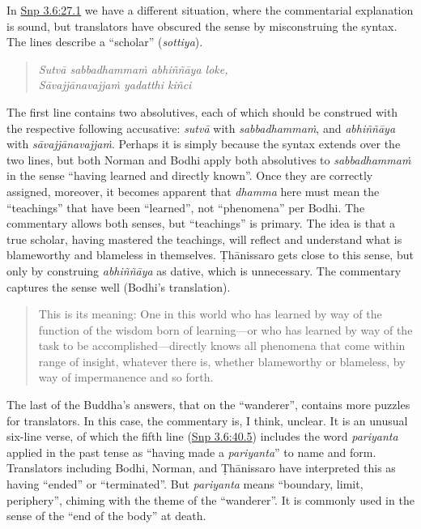 \documentclass[12pt,openany]{book}%
\begin{document}
In \href{https://suttacentral.net/snp3.6/en/sujato\#27.1}{Snp 3.6:27.1} we have a different situation, where the commentarial explanation is sound, but translators have obscured the sense by misconstruing the syntax. The lines describe a “scholar” (\textit{sottiya}). 

\begin{verse}%
\textit{\textsanskrit{Sutvā} \textsanskrit{sabbadhammaṁ} \textsanskrit{abhiññāya} loke,} \\
\textit{\textsanskrit{Sāvajjānavajjaṁ} yadatthi \textsanskrit{kiñci}}

%
\end{verse}

The first line contains two absolutives, each of which should be construed with the respective following accusative: \textit{\textsanskrit{sutvā}} with \textit{\textsanskrit{sabbadhammaṁ}}, and \textit{\textsanskrit{abhiññāya}} with \textit{\textsanskrit{sāvajjānavajjaṁ}}. Perhaps it is simply because the syntax extends over the two lines, but both Norman and Bodhi apply both absolutives to \textit{\textsanskrit{sabbadhammaṁ}} in the sense “having learned and directly known”. Once they are correctly assigned, moreover, it becomes apparent that \textit{dhamma} here must mean the “teachings” that have been “learned”, not “phenomena” per Bodhi. The commentary allows both senses, but “teachings” is primary. The idea is that a true scholar, having mastered the teachings, will reflect and understand what is blameworthy and blameless in themselves. \textsanskrit{Ṭhānissaro} gets close to this sense, but only by construing \textit{\textsanskrit{abhiññāya}} as dative, which is unnecessary. The commentary captures the sense well (Bodhi’s translation).

\begin{quotation}%
This is its meaning: One in this world who has learned by way of the function of the wisdom born of learning—or who has learned by way of the task to be accomplished—directly knows all phenomena that come within range of insight, whatever there is, whether blameworthy or blameless, by way of impermanence and so forth.

%
\end{quotation}

The last of the Buddha’s answers, that on the “wanderer”, contains more puzzles for translators. In this case, the commentary is, I think, unclear. It is an unusual six-line verse, of which the fifth line (\href{https://suttacentral.net/snp3.6/en/sujato\#40.5}{Snp 3.6:40.5}) includes the word \textit{pariyanta} applied in the past tense as “having made a \textit{pariyanta}” to name and form. Translators including Bodhi, Norman, and \textsanskrit{Ṭhānissaro} have interpreted this as having “ended” or “terminated”. But \textit{pariyanta} means “boundary, limit, periphery”, chiming with the theme of the “wanderer”. It is commonly used in the sense of the “end of the body” at death. 
\end{document}
